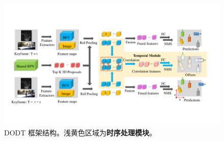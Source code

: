 \begin{figure}[h]
	\begin{center}
		\includegraphics[trim={1.1cm, 3.3cm, 1.5cm, 3.5cm}, clip, width=\textwidth]{imgs/structure_final.pdf}
	\end{center}
	\vspace{-0.8cm}
	\caption{DODT 框架结构。浅黄色区域为\textbf{时序处理模块}。}
	\label{fig:dodt}
\end{figure}
